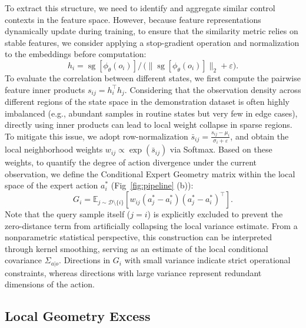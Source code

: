 To extract this structure, we need to identify and aggregate similar control contexts in the feature space. 
However, because feature representations dynamically update during training, 
to ensure that the similarity metric relies on stable features, we consider applying a stop-gradient operation and normalization to the embeddings before computation:
\begin{equation}
    h_i = \operatorname{sg}[\phi_\theta(o_i)]  \Big/ \,    \big(\|\operatorname{sg}[\phi_\theta(o_i)]\|_2 + \varepsilon \big).
\end{equation}
To evaluate the correlation between different states, 
we first compute the pairwise feature inner products \(s_{ij} = h_i^\top h_j\). 
Considering that the observation density across different regions of the state space in the demonstration dataset is often highly imbalanced
 (e.g., abundant samples in routine states but very few in edge cases), 
directly using inner products can lead to local weight collapse in sparse regions. 
To mitigate this issue, we adopt row-normalization \(\bar{s}_{ij} = \frac{s_{ij} - \mu_i}{\sigma_i + \varepsilon}\), 
and obtain the local neighborhood weights \(w_{ij} \propto \exp(\bar{s}_{ij})\) via Softmax.
Based on these weights, 
to quantify the degree of action divergence under the current observation, 
we define the Conditional Expert Geometry matrix within the local space of the expert action \(a_i^*\) (Fig~\ref{fig:pipeline} (b)):
\begin{equation}
    G_i = \mathbb{E}_{j \sim \mathcal{D} \setminus \{i\}} \left[ w_{ij} (a_j^* - a_i^*)(a_j^* - a_i^*)^\top \right].
    \label{eq:cond_expert_geometry}
\end{equation}
Note that the query sample itself (\(j=i\)) is explicitly excluded to prevent the zero-distance term from artificially collapsing the local variance estimate.
From a nonparametric statistical perspective, 
this construction can be interpreted through kernel smoothing, 
serving as an estimate of the local conditional covariance \(\Sigma_{a|o}\). 
Directions in \(G_i\) with small variance indicate strict operational constraints, 
whereas directions with large variance represent redundant dimensions of the action.

\subsection{Local Geometry Excess}


